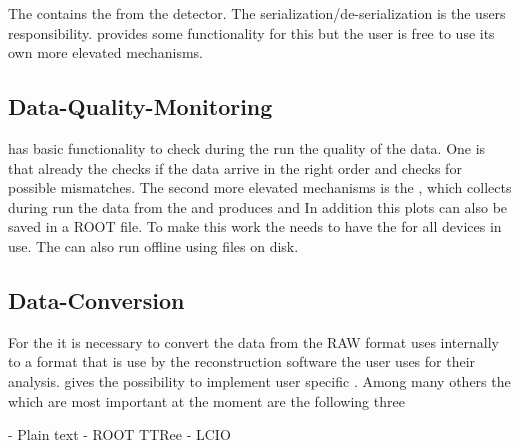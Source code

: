 The \datablock contains the \rawdata from the detector. The serialization/de-serialization is the users responsibility. 
\eudaq provides some functionality for this but the user is free to use its own more elevated mechanisms. 
 

\subsection{Data-Quality-Monitoring}

\eudaq has basic functionality to check during the run the quality of the data. 
One is that already the \dc checks if the data arrive in the right order and checks for possible mismatches. 
The second more elevated mechanisms is the \onlinemon, which collects during run the data from the \dc and produces \hitmaps and \corplots
In addition this  plots can also be saved in a ROOT file. 
To make this work the \onlinemon needs to have the \dataconverterplugin for all devices in use. 
The \onlinemon can also run offline using files on disk.


\subsection{Data-Conversion}
For the \offlineana it is necessary to convert the data from the RAW format \eudaq uses internally to a format that is use by the reconstruction software the user uses for their analysis. 
\eudaq gives the possibility to implement user specific \filewriter. 
Among many others the \filewriter which are most important at the moment are the following three 

- Plain text
- ROOT TTRee 
- LCIO 





